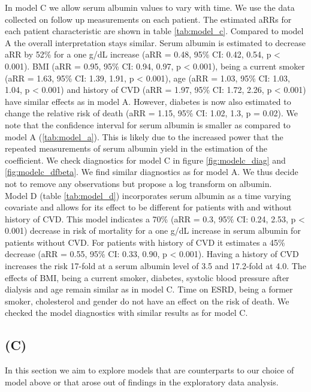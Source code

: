 \documentclass[paper=a4, fontsize=11pt]{scrartcl} %
\numberwithin{equation}{section} %
\numberwithin{figure}{section} %
\numberwithin{table}{section} %
\begin{document}
In model C we allow serum albumin values to vary with time. We use the data collected on follow up measurements on each patient. The estimated aRRs for each patient characteristic are shown in table \ref{tab:model_c}. Compared to model A the overall interpretation stays similar. Serum albumin is estimated to decrease aRR by 52\% for a one g/dL increase (aRR = 0.48, 95\% CI: 0.42, 0.54, p < 0.001). BMI (aRR = 0.95, 95\% CI: 0.94, 0.97, p < 0.001), being a current smoker (aRR = 1.63, 95\% CI: 1.39, 1.91, p < 0.001), age (aRR = 1.03, 95\% CI: 1.03, 1.04, p < 0.001) and history of CVD (aRR = 1.97, 95\% CI: 1.72, 2.26, p < 0.001) have similar effects as in model A. However, diabetes is now also estimated to change the relative risk of death (aRR = 1.15, 95\% CI: 1.02, 1.3, p = 0.02). We note that the confidence interval for serum albumin is smaller as compared to model A (\ref{tab:model_a}). This is likely due to the increased power that the repeated measurements of serum albumin yield in the estimation of the coefficient. %
We check diagnostics for model C in figure \ref{fig:modelc_diag} and \ref{fig:modelc_dfbeta}. We find similar diagnostics as for model A. We thus decide not to remove any observations but propose a log transform on albumin.\\

Model D (table \ref{tab:model_d}) incorporates serum albumin as a time varying covariate and allows for its effect to be different for patients with and without history of CVD. This model indicates a 70\% (aRR = 0.3, 95\% CI: 0.24, 2.53, p < 0.001) decrease in risk of mortality for a one g/dL increase in serum albumin for patients without CVD. For patients with history of CVD it estimates a 45\% decrease (aRR = 0.55, 95\% CI: 0.33, 0.90, p < 0.001). Having a history of CVD increases the risk 17-fold at a serum albumin level of 3.5 and 17.2-fold at 4.0. The effects of BMI, being a current smoker, diabetes, systolic blood pressure after dialysis and age remain similar as in model C. Time on ESRD, being a former smoker, cholesterol and gender do not have an effect on the risk of death. We checked the model diagnostics with similar results as for model C.

\subsection{(C)}
In this section we aim to explore models that are counterparts to our choice of model above or that arose out of findings in the exploratory data analysis.\\
\end{document}
